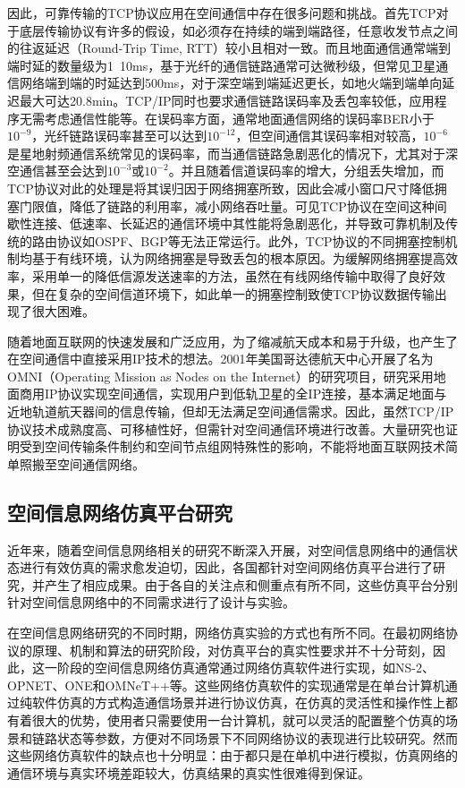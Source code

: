 \documentclass[winfonts,phd,twoside]{njuthesis}
\begin{document}
因此，可靠传输的TCP协议应用在空间通信中存在很多问题和挑战。首先TCP对于底层传输协议有许多的假设，如必须存在持续的端到端路径，任意收发节点之间的往返延迟（Round-Trip Time, RTT）较小且相对一致。而且地面通信通常端到端时延的数量级为1~10ms，基于光纤的通信链路通常可达微秒级，但常见卫星通信网络端到端的时延达到500ms，对于深空端到端延迟更长，如地火端到端单向延迟最大可达20.8min。TCP/IP同时也要求通信链路误码率及丢包率较低，应用程序无需考虑通信性能等。在误码率方面，通常地面通信网络的误码率BER小于$10^{-9}$，光纤链路误码率甚至可以达到$10^{-12}$，但空间通信其误码率相对较高，$10^{-6}$是星地射频通信系统常见的误码率，而当通信链路急剧恶化的情况下，尤其对于深空通信甚至会达到$10^{-3}$或$10^{-2}$。并且随着信道误码率的增大，分组丢失增加，而TCP协议对此的处理是将其误归因于网络拥塞所致，因此会减小窗口尺寸降低拥塞门限值，降低了链路的利用率，减小网络吞吐量。可见TCP协议在空间这种间歇性连接、低速率、长延迟的通信环境中其性能将急剧恶化，并导致可靠机制及传统的路由协议如OSPF、BGP等无法正常运行。此外，TCP协议的不同拥塞控制机制均基于有线环境，认为网络拥塞是导致丢包的根本原因。为缓解网络拥塞提高效率，采用单一的降低信源发送速率的方法，虽然在有线网络传输中取得了良好效果，但在复杂的空间信道环境下，如此单一的拥塞控制致使TCP协议数据传输出现了很大困难。

随着地面互联网的快速发展和广泛应用，为了缩减航天成本和易于升级，也产生了在空间通信中直接采用IP技术的想法。2001年美国哥达德航天中心开展了名为OMNI（Operating Mission as Nodes on the Internet）的研究项目，研究采用地面商用IP协议实现空间通信，实现用户到低轨卫星的全IP连接，基本满足地面与近地轨道航天器间的信息传输，但却无法满足空间通信需求。因此，虽然TCP/IP协议技术成熟度高、可移植性好，但需针对空间通信环境进行改善。大量研究也证明受到空间传输条件制约和空间节点组网特殊性的影响，不能将地面互联网技术简单照搬至空间通信网络。

\subsection{空间信息网络仿真平台研究}
近年来，随着空间信息网络相关的研究不断深入开展，对空间信息网络中的通信状态进行有效仿真的需求愈发迫切，因此，各国都针对空间网络仿真平台进行了研究，并产生了相应成果。由于各自的关注点和侧重点有所不同，这些仿真平台分别针对空间信息网络中的不同需求进行了设计与实验。

在空间信息网络研究的不同时期，网络仿真实验的方式也有所不同。在最初网络协议的原理、机制和算法的研究阶段，对仿真平台的真实性要求并不十分苛刻，因此，这一阶段的空间信息网络仿真通常通过网络仿真软件进行实现，如NS-2、OPNET、ONE和OMNeT++等。这些网络仿真软件的实现通常是在单台计算机通过纯软件仿真的方式构造通信场景并进行协议仿真，在仿真的灵活性和操作性上都有着很大的优势，使用者只需要使用一台计算机，就可以灵活的配置整个仿真的场景和链路状态等参数，方便对不同场景下不同网络协议的表现进行比较研究。然而这些网络仿真软件的缺点也十分明显：由于都只是在单机中进行模拟，仿真网络的通信环境与真实环境差距较大，仿真结果的真实性很难得到保证。
\end{document}
